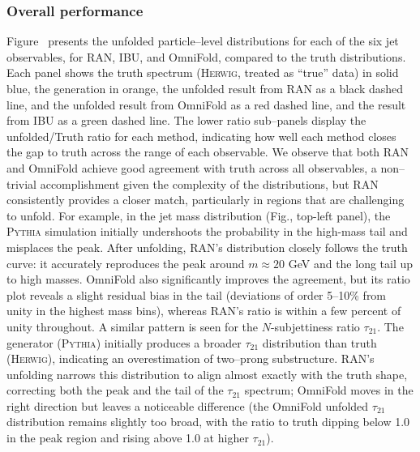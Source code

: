         \subsubsection{Overall performance}
            Figure~ presents the unfolded particle--level distributions for each of the six jet observables, for RAN, IBU, and OmniFold, compared to the truth distributions.
            Each panel shows the truth spectrum (\textsc{Herwig}, treated as “true” data) in solid blue, the generation in orange, the unfolded result from RAN as a black dashed line, and the unfolded result from OmniFold as a red dashed line, and the result from IBU as a green dashed line.
            The lower ratio sub--panels display the unfolded/Truth ratio for each method, indicating how well each method closes the gap to truth across the range of each observable.
            We observe that both RAN and OmniFold achieve good agreement with truth across all observables, a non--trivial accomplishment given the complexity of the distributions, but RAN consistently provides a closer match, particularly in regions that are challenging to unfold.
            For example, in the jet mass distribution (Fig., top-left panel), the \textsc{Pythia} simulation initially undershoots the probability in the high-mass tail and misplaces the peak.
            After unfolding, RAN’s distribution closely follows the truth curve: it accurately reproduces the peak around $m\approx 20$ GeV and the long tail up to high masses. OmniFold also significantly improves the agreement, but its ratio plot reveals a slight residual bias in the tail (deviations of order 5–10\% from unity in the highest mass bins), whereas RAN’s ratio is within a few percent of unity throughout.
            A similar pattern is seen for the $N$-subjettiness ratio $\tau_{21}$.
            The generator (\textsc{Pythia}) initially produces a broader $\tau_{21}$ distribution than truth (\textsc{Herwig}), indicating an overestimation of two--prong substructure.
            RAN’s unfolding narrows this distribution to align almost exactly with the truth shape, correcting both the peak and the tail of the $\tau_{21}$ spectrum; OmniFold moves in the right direction but leaves a noticeable difference (the OmniFold unfolded $\tau_{21}$ distribution remains slightly too broad, with the ratio to truth dipping below 1.0 in the peak region and rising above 1.0 at higher $\tau_{21}$).
